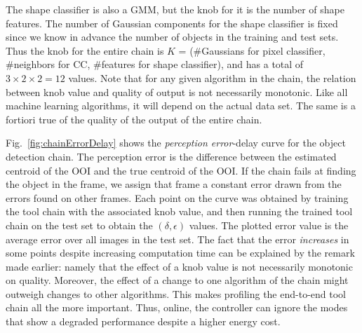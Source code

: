 The shape classifier is also a GMM, but the knob for it is the number of shape features.
The number of Gaussian components for the shape classifier is fixed since we know in advance the number of objects in the training and test sets.
Thus the knob for the entire chain is $K$ = (\#Gaussians for pixel classifier, \#neighbors for CC, \#features for shape classifier), and has a total of $3 \times 2 \times 2 = 12$ values.
Note that for any given algorithm in the chain, the relation between knob value and quality of output is not necessarily monotonic.
Like all machine learning algorithms, it will depend on the actual data set.
The same is a fortiori true of the quality of the output of the entire chain.

Fig.~\ref{fig:chainErrorDelay} shows the \emph{perception error}-delay curve for the object detection chain.
The perception error is the difference between the estimated centroid of the OOI and the true centroid of the OOI.
If the chain fails at finding the object in the frame, we assign that frame a constant error drawn from the errors found on other frames.
Each point on the curve was obtained by training the tool chain with the associated knob value, and then running the trained tool chain on the test set to obtain the $(\delta,\epsilon)$ values.
The plotted error value is the average error over all images in the test set.
The fact that the error \emph{increases} in some points despite increasing computation time can be explained by the remark made earlier: namely that the effect of a knob value is not necessarily monotonic on quality.
Moreover, the effect of a change to one algorithm of the chain might outweigh changes to other algorithms.
This makes profiling the end-to-end tool chain all the more important.
Thus, online, the controller can ignore the modes that show a degraded performance despite a higher energy cost.


